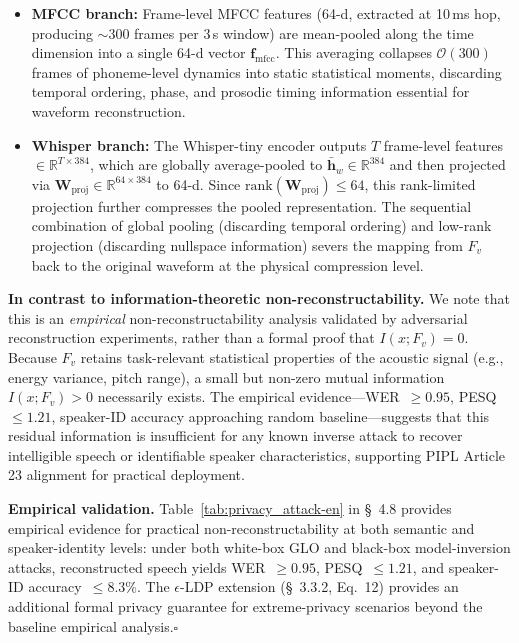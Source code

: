 \documentclass[11pt, a4paper]{article}
\begin{document}
\begin{itemize}
\item \textbf{MFCC branch:} Frame-level MFCC features (64-d, extracted at 10\,ms hop, producing $\sim$300 frames per 3\,s window) are mean-pooled along the time dimension into a single 64-d vector $\bm{f}_{\mathrm{mfcc}}$. This averaging collapses $\mathcal{O}(300)$ frames of phoneme-level dynamics into static statistical moments, discarding temporal ordering, phase, and prosodic timing information essential for waveform reconstruction.

\item \textbf{Whisper branch:} The Whisper-tiny encoder outputs $T$ frame-level features $\in\mathbb{R}^{T\times 384}$, which are globally average-pooled to $\bar{\bm{h}}_w\in\mathbb{R}^{384}$ and then projected via $\bm{W}_{\mathrm{proj}}\in\mathbb{R}^{64\times 384}$ to 64-d. Since $\mathrm{rank}(\bm{W}_{\mathrm{proj}})\le 64$, this rank-limited projection further compresses the pooled representation. The sequential combination of global pooling (discarding temporal ordering) and low-rank projection (discarding nullspace information) severs the mapping from $F_v$ back to the original waveform at the physical compression level.
\end{itemize}

\noindent\textbf{In contrast to information-theoretic non-reconstructability.} We note that this is an \emph{empirical} non-reconstructability analysis validated by adversarial reconstruction experiments, rather than a formal proof that $I(x;F_v)=0$. Because $F_v$ retains task-relevant statistical properties of the acoustic signal (e.g., energy variance, pitch range), a small but non-zero mutual information $I(x;F_v)>0$ necessarily exists. The empirical evidence---WER~$\ge 0.95$, PESQ~$\le 1.21$, speaker-ID accuracy approaching random baseline---suggests that this residual information is insufficient for any known inverse attack to recover intelligible speech or identifiable speaker characteristics, supporting PIPL Article 23 alignment for practical deployment.

\medskip
\noindent\textbf{Empirical validation.} Table~\ref{tab:privacy_attack-en} in \S~4.8 provides empirical evidence for practical non-reconstructability at both semantic and speaker-identity levels: under both white-box GLO and black-box model-inversion attacks, reconstructed speech yields WER~$\ge 0.95$, PESQ~$\le 1.21$, and speaker-ID accuracy~$\le 8.3\%$. The $\epsilon$-LDP extension (\S~3.3.2, Eq.~12) provides an additional formal privacy guarantee for extreme-privacy scenarios beyond the baseline empirical analysis.\hfill$\square$

\newpage
\printbibliography
\end{document}
